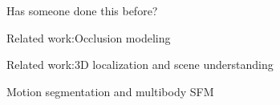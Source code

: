 
\begin{frame}{Has someone done this before?}
  \cite{Geiger_etal_2012} 

  \cite{Milan_etal_2014}


  \cite{Wojek_etal_2013} 
    
\end{frame}

\begin{frame}{Related work:Occlusion modeling}
    
\end{frame}

\begin{frame}{Related work:3D localization and scene understanding}
    
\end{frame}

\begin{frame}{Motion segmentation and multibody SFM}
    
\end{frame}

